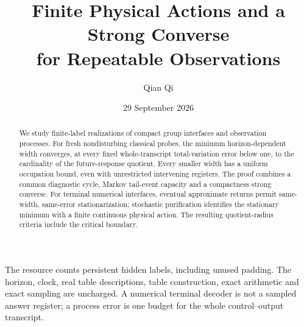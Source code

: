 \documentclass[11pt]{amsart}
\title[Finite actions and a process strong converse]{Finite Physical Actions and a Strong Converse\\for Repeatable Observations}
\author{Qian Qi}
\date{29 September 2026}
\numberwithin{equation}{section}
\theoremstyle{definition}\newtheorem{definition}[theorem]{Definition}
\theoremstyle{remark}\newtheorem{remark}[theorem]{Remark}
\begin{document}
\begin{abstract}
We study finite-label realizations of compact group interfaces and
observation processes. For fresh nondisturbing classical probes, the
minimum horizon-dependent width converges, at every fixed
whole-transcript total-variation error below one, to the cardinality
of the future-response quotient. Every smaller width has a uniform
occupation bound, even with unrestricted intervening registers.
The proof combines a common diagnostic cycle, Markov tail-event
capacity and a compactness strong converse. For terminal numerical
interfaces, eventual approximate returns permit same-width,
same-error stationarization; stochastic purification identifies the
stationary minimum with a finite continuous physical action.
The resulting quotient-radius criteria include the critical boundary.
\end{abstract}
\maketitle
\noindent The resource counts persistent hidden labels, including unused
padding. The horizon, clock, real table descriptions, table construction,
exact arithmetic and exact sampling are uncharged. A numerical terminal
decoder is not a sampled answer register; a process error is one budget
for the whole control--output transcript.
















\end{document}
